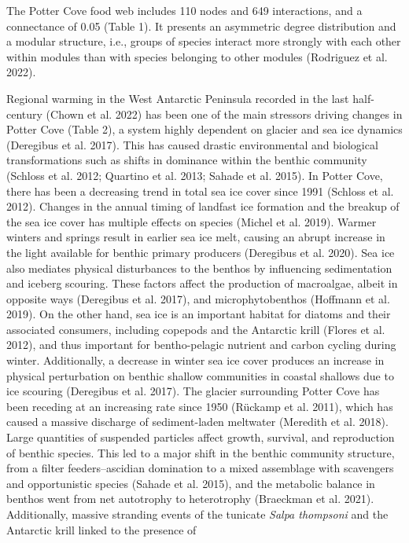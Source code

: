 \documentclass[
]{article}
\begin{document}
The Potter Cove food web includes 110 nodes and 649 interactions, and a
connectance of 0.05 (Table 1). It presents an asymmetric degree
distribution and a modular structure, i.e., groups of species interact
more strongly with each other within modules than with species belonging
to other modules (Rodriguez et al. 2022).

Regional warming in the West Antarctic Peninsula recorded in the last
half-century (Chown et al. 2022) has been one of the main stressors
driving changes in Potter Cove (Table 2), a system highly dependent on
glacier and sea ice dynamics (Deregibus et al. 2017). This has caused
drastic environmental and biological transformations such as shifts in
dominance within the benthic community (Schloss et al. 2012; Quartino et
al. 2013; Sahade et al. 2015). In Potter Cove, there has been a
decreasing trend in total sea ice cover since 1991 (Schloss et al.
2012). Changes in the annual timing of landfast ice formation and the
breakup of the sea ice cover has multiple effects on species (Michel et
al. 2019). Warmer winters and springs result in earlier sea ice melt,
causing an abrupt increase in the light available for benthic primary
producers (Deregibus et al. 2020). Sea ice also mediates physical
disturbances to the benthos by influencing sedimentation and iceberg
scouring. These factors affect the production of macroalgae, albeit in
opposite ways (Deregibus et al. 2017), and microphytobenthos (Hoffmann
et al. 2019). On the other hand, sea ice is an important habitat for
diatoms and their associated consumers, including copepods and the
Antarctic krill (Flores et al. 2012), and thus important for
bentho-pelagic nutrient and carbon cycling during winter. Additionally,
a decrease in winter sea ice cover produces an increase in physical
perturbation on benthic shallow communities in coastal shallows due to
ice scouring (Deregibus et al. 2017). The glacier surrounding Potter
Cove has been receding at an increasing rate since 1950 (Rückamp et al.
2011), which has caused a massive discharge of sediment-laden meltwater
(Meredith et al. 2018). Large quantities of suspended particles affect
growth, survival, and reproduction of benthic species. This led to a
major shift in the benthic community structure, from a filter
feeders--ascidian domination to a mixed assemblage with scavengers and
opportunistic species (Sahade et al. 2015), and the metabolic balance in
benthos went from net autotrophy to heterotrophy (Braeckman et al.
2021). Additionally, massive stranding events of the tunicate
\emph{Salpa thompsoni} and the Antarctic krill linked to the presence of
\end{document}
